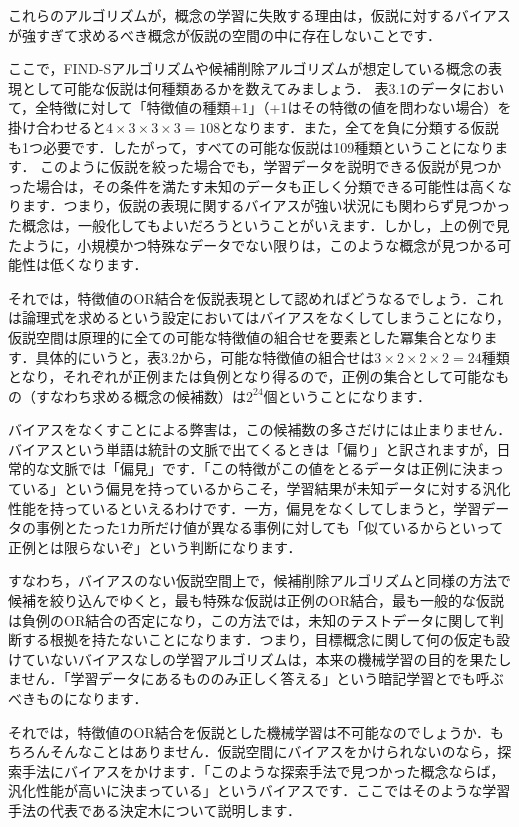 これらのアルゴリズムが，概念の学習に失敗する理由は，仮説に対するバイアスが強すぎて求めるべき概念が仮説の空間の中に存在しないことです．


ここで，FIND-Sアルゴリズムや候補削除アルゴリズムが想定している概念の表現として可能な仮説は何種類あるかを数えてみましょう．
表3.1のデータにおいて，全特徴に対して「特徴値の種類+1」（+1はその特徴の値を問わない場合）を掛け合わせると$4 \times 3 \times 3 \times 3 = 108$となります．また，全てを負に分類する仮説も1つ必要です．したがって，すべての可能な仮説は109種類ということになります．
このように仮説を絞った場合でも，学習データを説明できる仮説が見つかった場合は，その条件を満たす未知のデータも正しく分類できる可能性は高くなります．つまり，仮説の表現に関するバイアスが強い状況にも関わらず見つかった概念は，一般化してもよいだろうということがいえます．しかし，上の例で見たように，小規模かつ特殊なデータでない限りは，このような概念が見つかる可能性は低くなります．

それでは，特徴値のOR結合を仮説表現として認めればどうなるでしょう．これは論理式を求めるという設定においてはバイアスをなくしてしまうことになり，仮説空間は原理的に全ての可能な特徴値の組合せを要素とした冪集合となります．具体的にいうと，表3.2から，可能な特徴値の組合せは$3 \times 2 \times 2 \times 2 = 24$種類となり，それぞれが正例または負例となり得るので，正例の集合として可能なもの（すなわち求める概念の候補数）は$2^{24}$個ということになります．

バイアスをなくすことによる弊害は，この候補数の多さだけには止まりません．バイアスという単語は統計の文脈で出てくるときは「偏り」と訳されますが，日常的な文脈では「偏見」です．「この特徴がこの値をとるデータは正例に決まっている」という偏見を持っているからこそ，学習結果が未知データに対する汎化性能を持っているといえるわけです．一方，偏見をなくしてしまうと，学習データの事例とたった1カ所だけ値が異なる事例に対しても「似ているからといって正例とは限らないぞ」という判断になります．

すなわち，バイアスのない仮説空間上で，候補削除アルゴリズムと同様の方法で候補を絞り込んでゆくと，最も特殊な仮説は正例のOR結合，最も一般的な仮説は負例のOR結合の否定になり，この方法では，未知のテストデータに関して判断する根拠を持たないことになります．つまり，目標概念に関して何の仮定も設けていないバイアスなしの学習アルゴリズムは，本来の機械学習の目的を果たしません．「学習データにあるもののみ正しく答える」という暗記学習とでも呼ぶべきものになります．


それでは，特徴値のOR結合を仮説とした機械学習は不可能なのでしょうか．もちろんそんなことはありません．仮説空間にバイアスをかけられないのなら，探索手法にバイアスをかけます．「このような探索手法で見つかった概念ならば，汎化性能が高いに決まっている」というバイアスです．ここではそのような学習手法の代表である決定木について説明します．

